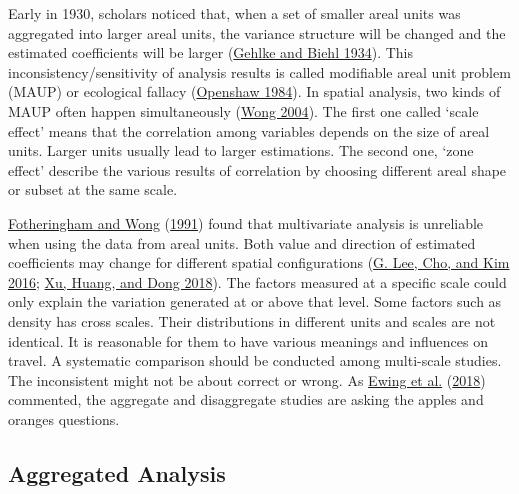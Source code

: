 \documentclass[
  11pt,
  openany]{memoir}
\begin{document}
Early in 1930, scholars noticed that, when a set of smaller areal units was aggregated into larger areal units, the variance structure will be changed and the estimated coefficients will be larger (\protect\hyperlink{ref-gehlkeCertainEffectsGrouping1934}{Gehlke and Biehl 1934}). This inconsistency/sensitivity of analysis results is called modifiable areal unit problem (MAUP) or ecological fallacy (\protect\hyperlink{ref-openshawEcologicalFallaciesAnalysis1984}{Openshaw 1984}).
In spatial analysis, two kinds of MAUP often happen simultaneously (\protect\hyperlink{ref-wongModifiableArealUnit2004}{Wong 2004}). The first one called `scale effect' means that the correlation among variables depends on the size of areal units. Larger units usually lead to larger estimations. The second one, `zone effect' describe the various results of correlation by choosing different areal shape or subset at the same scale.

\protect\hyperlink{ref-fotheringhamModifiableArealUnit1991}{Fotheringham and Wong} (\protect\hyperlink{ref-fotheringhamModifiableArealUnit1991}{1991}) found that multivariate analysis is unreliable when using the data from areal units. Both value and direction of estimated coefficients may change for different spatial configurations (\protect\hyperlink{ref-leeModifiableArealUnit2016}{G. Lee, Cho, and Kim 2016}; \protect\hyperlink{ref-xuModifiableArealUnit2018}{Xu, Huang, and Dong 2018}).
The factors measured at a specific scale could only explain the variation generated at or above that level. Some factors such as density has cross scales. Their distributions in different units and scales are not identical. It is reasonable for them to have various meanings and influences on travel. A systematic comparison should be conducted among multi-scale studies. The inconsistent might not be about correct or wrong. As \protect\hyperlink{ref-ewingTestingNewmanKenworthy2018}{Ewing et al.} (\protect\hyperlink{ref-ewingTestingNewmanKenworthy2018}{2018}) commented, the aggregate and disaggregate studies are asking the apples and oranges questions.

\hypertarget{aggregated-analysis}{%
\subsection{Aggregated Analysis}\label{aggregated-analysis}}
\end{document}

